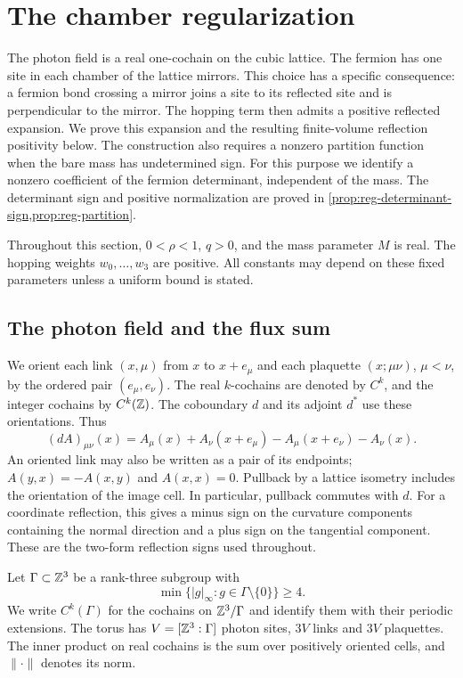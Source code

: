 \section{The chamber regularization}\label{sec:regularization}

The photon field is a real one-cochain on the cubic lattice. The fermion
has one site in each chamber of the lattice mirrors. This choice has a
specific consequence: a fermion bond crossing a mirror joins a site to
its reflected site and is perpendicular to the mirror. The hopping term
then admits a positive reflected expansion. We prove this expansion and
the resulting finite-volume reflection positivity below. The construction
also requires a nonzero partition function when the bare mass has
undetermined sign. For this purpose we identify a nonzero coefficient
of the fermion determinant, independent of the mass. The determinant
sign and positive normalization are proved in
\cref{prop:reg-determinant-sign,prop:reg-partition}.

Throughout this section, $0<\rho<1$, $q>0$, and the mass parameter $M$
is real. The hopping weights $w_0,\ldots,w_3$ are positive. All constants may depend on these fixed parameters unless a uniform
bound is stated.

\subsection{The photon field and the flux sum}\label{subsec:reg-photon}

We orient each link $(x,\mu)$ from $x$ to $x+e_\mu$ and each plaquette
$(x;\mu\nu)$, $\mu<\nu$, by the ordered pair $(e_\mu,e_\nu)$.
The real $k$-cochains are denoted by $C^k$, and the integer cochains by
$C^k(\mathbb Z)$. The coboundary $d$ and its adjoint $d^*$ use these
orientations. Thus
\begin{equation}\label{eq:reg-coboundary}
 (dA)_{\mu\nu}(x)=A_\mu(x)+A_\nu(x+e_\mu)
                     -A_\mu(x+e_\nu)-A_\nu(x).
\end{equation}
An oriented link may also be written as a pair of its endpoints;
$A(y,x)=-A(x,y)$ and $A(x,x)=0$. Pullback by a lattice isometry includes
the orientation of the image cell. In particular, pullback commutes
with $d$. For a coordinate reflection, this gives a minus sign on
the curvature components containing the normal direction and a
plus sign on the tangential component. These are the two-form
reflection signs used throughout.

Let $\Gamma\subset\mathbb Z^3$ be a rank-three subgroup with
\[
 \min\{|g|_\infty:g\in\Gamma\setminus\{0\}\}\ge4.
\]
We write $C^k(\Gamma)$ for the cochains on $\mathbb Z^3/\Gamma$ and identify
them with their periodic extensions. The torus has
$V=[\mathbb Z^3:\Gamma]$ photon sites, $3V$ links and $3V$ plaquettes. The
inner product on real cochains is the sum over positively oriented
cells, and $\|\cdot\|$ denotes its norm.

